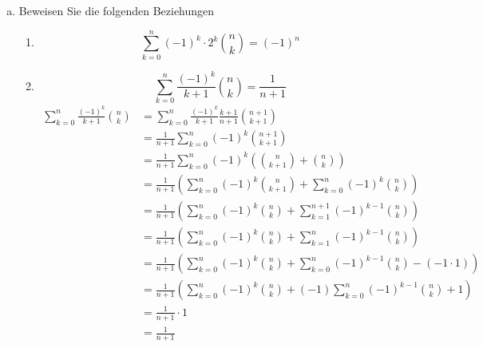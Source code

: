 \documentclass{article}
\begin{document}
\begin{enumerate}[a)]
\item
  Beweisen Sie die folgenden Beziehungen
  \begin{enumerate}[1)]
  \item
    \[
      \sum\limits_{k=0}^{n}(-1)^k \cdot 2^k \binom{n}{k} = (-1)^n
    \]
  \item
    \[
      \sum\limits_{k=0}^{n} \frac{(-1)^k}{k + 1} \binom{n}{k} = \frac{1}{n + 1}
    \]
    \begin{align*}
      \sum\limits_{k=0}^{n} \frac{(-1)^k}{k + 1} \binom{n}{k} &= \sum\limits_{k=0}^{n} \frac{(-1)^k}{k + 1} \frac{k + 1}{n + 1} \binom{n + 1}{k + 1} \\
                                                              &= \frac{1}{n + 1} \sum\limits_{k=0}^{n} (-1)^k \binom{n + 1}{k + 1} \\
                                                              &= \frac{1}{n + 1} \sum\limits_{k=0}^{n} (-1)^k \left(\binom{n}{k + 1} +\binom{n}{k}\right) \\
                                                              &= \frac{1}{n + 1} \left(\sum\limits_{k=0}^{n} (-1)^k \binom{n}{k + 1} + \sum\limits_{k=0}^{n} (-1)^k \binom{n}{k}\right) \\
                                                              &= \frac{1}{n + 1} \left(\sum\limits_{k=0}^{n} (-1)^k \binom{n}{k} + \sum\limits_{k=1}^{n+1} (-1)^{k-1} \binom{n}{k}\right) \\
                                                              &= \frac{1}{n + 1} \left(\sum\limits_{k=0}^{n} (-1)^k \binom{n}{k} + \sum\limits_{k=1}^{n} (-1)^{k-1} \binom{n}{k}\right) \\
                                                              &= \frac{1}{n + 1} \left(\sum\limits_{k=0}^{n} (-1)^k \binom{n}{k} + \sum\limits_{k=0}^{n} (-1)^{k-1} \binom{n}{k}  -(-1 \cdot 1) \right) \\
                                                              &= \frac{1}{n + 1} \left(\sum\limits_{k=0}^{n} (-1)^k \binom{n}{k} + (-1) \sum\limits_{k=0}^{n} (-1)^{k-1} \binom{n}{k} + 1 \right) \\
                                                              &= \frac{1}{n + 1} \cdot 1 \\
                                                              &= \frac{1}{n + 1} \\
    \end{align*}
  \end{enumerate}
\end{enumerate}
\end{document}
